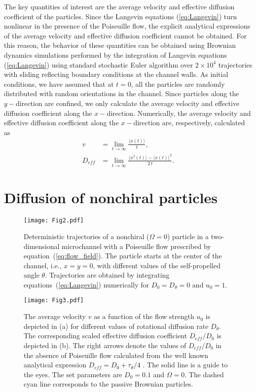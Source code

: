 \documentclass[aps,pre,preprint,superscriptaddress,amsmath,amssymb,nofootinbib]{revtex4}
\begin{document}
The key quantities of interest are the average velocity and effective diffusion coefficient of the particles. 
Since the Langevin equations (\ref{eq:Langevin}) turn nonlinear in the presence of the Poiseuille flow, the explicit analytical expressions of the average velocity and effective diffusion coefficient cannot be obtained.
For this reason, the behavior of these quantities can be obtained using Brownian dynamics simulations performed by the integration of Langevin equations (\ref{eq:Langevin}) using standard stochastic Euler algorithm over $2 \times 10^4$ trajectories with sliding reflecting boundary conditions at the channel walls.
 As initial conditions, we have assumed that at $t = 0$, all the particles are randomly distributed with random orientations in the channel.
 Since particles along the $y-$direction are confined, we only calculate the average velocity and effective diffusion coefficient along the $x-$direction. 
 Numerically, the average velocity and effective diffusion coefficient along the $x-$direction are, respectively, calculated as 
 \begin{align}
 v &= \lim_{t\to\infty} \frac{\langle x(t) \rangle}{t}, \label{eq:velocity}\\
 D_{eff}  &= \lim_{t\to\infty} \frac{\langle x^2(t) \rangle - \langle x(t) \rangle ^2 }{2 \,t}. \label{eq:diffusion}
 \end{align}
 
 \section{Diffusion of nonchiral particles}\label{Nonchiral}
 
\begin{figure}[htb!]
\centering
\texttt{[image: Fig2.pdf]}
\caption{Deterministic trajectories of a nonchiral ($\Omega = 0$) particle in 
a two-dimensional microchannel with a Poiseuille flow prescribed by equation~(\ref{eq:flow_field}). The particle starts at the center of the channel, i.e., $x = y = 0$, with different values of the self-propelled angle $\theta$. Trajectories are obtained by integrating equations~(\ref{eq:Langevin}) numerically for $D_0 = D_\theta = 0$ and $u_0 = 1$.}
\label{fig:graph2}
\end{figure} 

\begin{figure}[t]
\centering
\texttt{[image: Fig3.pdf]}
\caption{The average velocity $v$ as a function of the flow strength $u_0$ is depicted in (a) for different values of rotational diffusion rate $D_\theta$. 
The corresponding scaled effective diffusion coefficient $D_{eff}/D_0$ is depicted in (b). 
The right arrows denote the values of $D_{eff}/D_0$ in the absence of Poiseuille flow calculated from the well known analytical expression  $D_{eff} = D_0 + \tau_\theta/4$ \cite{Howse_PRL}. The solid line is a guide to the eyes. The set parameters are $D_0 = 0.1$ and $\Omega = 0$. The dashed cyan line corresponds to the passive Brownian particles.}
\label{fig:graph3}
\end{figure}
 
\end{document}
